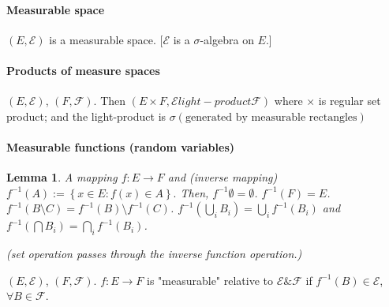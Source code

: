 \documentclass[11pt]{article}
\newtheorem{lemma}[theorem]{Lemma}
\begin{document}
\paragraph{Measurable space }
$(E, \mathcal E)$ is a measurable space. [$\mathcal E$ is a $\sigma$-algebra on
$E$.]

\paragraph{Products of measure spaces} $(E, \mathcal E)$, $(F, \mathcal F)$.
Then $\left( E \times F, \mathcal E light-product \mathcal F \right)$ where
$\times$ is regular set product; and the light-product is $\sigma \left( \text{
generated by measurable rectangles} 
\right)$

\paragraph{Measurable functions (random variables)}

\begin{lemma}
  A mapping $f: E\to F$ and (inverse mapping) $f^{-1} (A) := \left\{ x \in E :
    f(x) \in A
  \right\}.$ Then, $f^{-1} \emptyset = \emptyset$. $f^{-1}(F) = E$. $f^{-1}
  (B\setminus C) = f^{-1} (B) \setminus f^{-1} (C)$. 
  $f^{-1}\left( \bigcup _ i B_i \right) = \bigcup _i f^{-1}(B_i)$ and $f^{-1}\left( \bigcap B_i \right) =
  \bigcap _ i f^{-1}\left( B_i \right)$.


  (set operation passes through the inverse function operation.)
  \label{lemma:measurable-function}
\end{lemma}


\begin{definition}
  $(E, \mathcal E)$, $(F, \mathcal F)$. $f: E\to F$ is "measurable" relative to
  $\mathcal E \& \mathcal F$ if $f^{-1}(B) \in \mathcal E$, $\forall B \in
  \mathcal F$. 
\end{definition}
\end{document}
